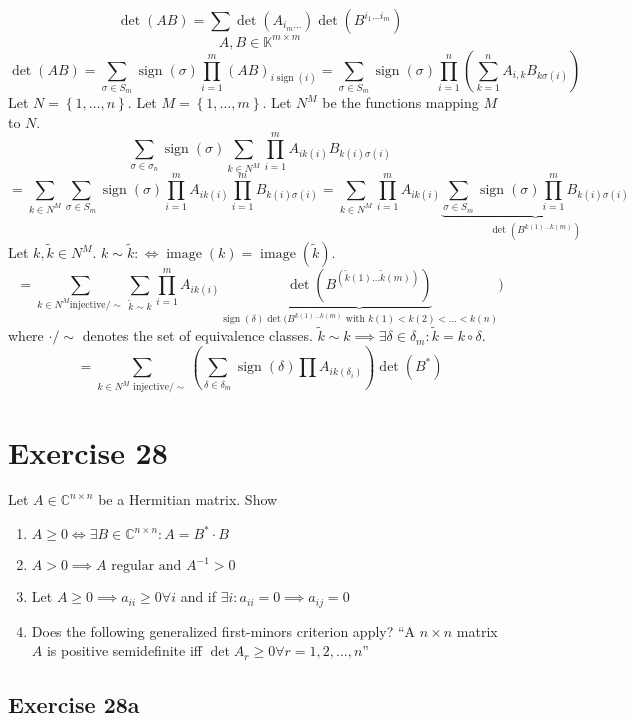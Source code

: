 \documentclass[a4paper]{article}
\theoremstyle{definition}
\DeclareMathOperator\image{image}
\DeclareMathOperator\sign{sign}
\newcommand\set[1]{\left\{#1\right\}}
\begin{document}
\[ \det(AB) = \sum \det(A_{i_m \ldots}) \det(B^{i_1 \ldots i_m}) \]
\[ A,B \in \mathbb K^{m \times m} \]
\[ \det(AB) = \sum_{\sigma \in S_m} \sign(\sigma) \prod_{i=1}^m (AB)_{i \sign(i)} =
  \sum_{\sigma \in S_m} \sign(\sigma) \prod_{i=1}^n \left(\sum_{k=1}^n A_{i,k} B_{k \sigma(i)} \right)
\]
Let $N = \set{1, \ldots, n}$. Let $M = \set{1, \ldots, m}$. Let $N^M$ be the functions mapping $M$ to $N$.
\[
  \sum _{\sigma \in \sigma_n} \sign(\sigma) \sum_{k \in N^M} \prod_{i=1}^m A_{i k(i)} B_{k(i) \sigma(i)}
\] \[
  = \sum_{k \in N^M} \sum_{\sigma \in S_m} \sign(\sigma) \prod_{i=1}^m A_{ik(i)} \prod_{i=1}^m B_{k(i) \sigma(i)}
  = \sum_{k \in N^M} \prod_{i=1}^m A_{i k(i)} \underbrace{\sum_{\sigma \in S_m} \sign(\sigma) \prod_{i=1}^m B_{k(i) \sigma(i)}}_{\det(B^{k(1) \ldots k(m)})}
\]
Let $k, \tilde k \in N^M$. $k \sim \tilde k :\iff \image(k) = \image(\tilde k)$.
\[ = \sum_{k \in N^M \text{injective} / \sim} \sum_{\tilde k \sim k} \prod_{i=1}^m A_{ik(i)} \underbrace{\det(B^{(\tilde k(1) \ldots \tilde k(m))})}_{\sign(\delta) \det(B^{k(1) \ldots k(m)} \text{ with } k(1) < k(2) < \ldots < k(n)}) \]
where $\cdot/\sim$ denotes the set of equivalence classes. $\tilde k \sim k \implies \exists \delta \in \delta_m: \tilde k = k \circ \delta$.
\[ = \sum_{k \in N^M \text{ injective} / \sim} \left(\sum_{\delta \in \delta_m} \sign(\delta) \prod A_{i k(\delta_i)}\right) \det(B^*) \]

\section{Exercise 28}
\begin{ex}
  Let $A \in \mathbb C^{n \times n}$ be a Hermitian matrix. Show
  \begin{enumerate}
    \item $A \geq 0 \iff \exists B \in \mathbb C^{n \times n}: A = B^* \cdot B$
    \item $A > 0 \implies A \text{ regular and } A^{-1} > 0$
    \item Let $A \geq 0 \implies a_{ii} \geq 0 \forall i$ and if $\exists i: a_{ii} = 0 \implies a_{ij} = 0$
    \item Does the following generalized first-minors criterion apply?
      \enquote{A $n \times n$ matrix $A$ is positive semidefinite iff $\det{A_r} \geq 0 \forall r = 1, 2, \ldots, n$}
  \end{enumerate}
\end{ex}

\subsection{Exercise 28a}
\end{document}

